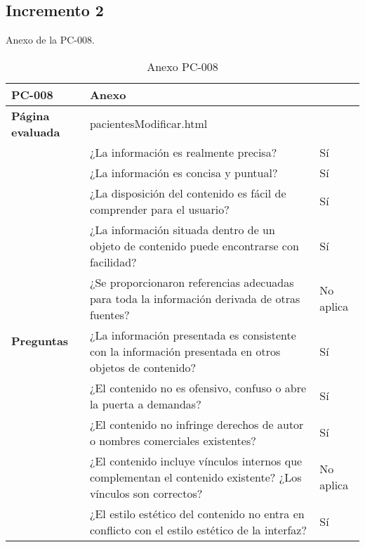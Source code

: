 \subsection{Incremento 2}

Anexo de la PC-008.

\begin{table}[htpb]
\centering
\begin{tabularx}{\textwidth}{|l|X|l|}
\hline
\rowcolor[gray]{0.9}\textbf{PC-008}                       & \multicolumn{2}{l|}{Anexo}                                                                                                \\ \hline
\textbf{Página evaluada}             & \multicolumn{2}{l|}{pacientesModificar.html}                                                                              \\ \hline
\multirow{10}{*}{\textbf{Preguntas}} & ¿La información es realmente precisa?                                                                         & Sí        \\ \cline{2-3} 
                                     & ¿La información es concisa y puntual?                                                                         & Sí        \\ \cline{2-3} 
                                     & ¿La disposición del contenido es fácil de comprender para el usuario?                                         & Sí        \\ \cline{2-3} 
                                     & ¿La información situada dentro de un objeto de contenido puede encontrarse con facilidad?                     & Sí        \\ \cline{2-3} 
                                     & ¿Se proporcionaron referencias adecuadas para toda la información derivada de otras fuentes?                  & No aplica \\ \cline{2-3} 
                                     & ¿La información presentada es consistente con la información presentada en otros objetos de contenido?        & Sí        \\ \cline{2-3} 
                                     & ¿El contenido no es ofensivo, confuso o abre la puerta a demandas?                                            & Sí        \\ \cline{2-3} 
                                     & ¿El contenido no infringe derechos de autor o nombres comerciales existentes?                                 & Sí        \\ \cline{2-3} 
                                     & ¿El contenido incluye vínculos internos que complementan el contenido existente? ¿Los vínculos son correctos? & No aplica \\ \cline{2-3} 
                                     & ¿El estilo estético del contenido no entra en conflicto con el estilo estético de la interfaz?                & Sí        \\ \hline
\end{tabularx}
\caption{Anexo PC-008}
\end{table}


